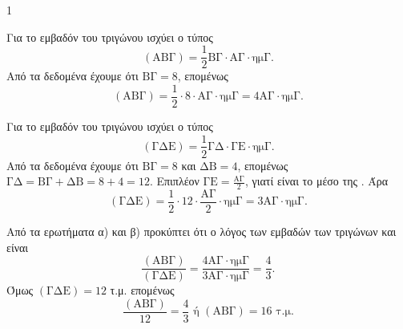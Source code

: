 \begin{ylh}{1}
    \item [Ύλη από εικόνα]
\end{ylh}
\begin{alist}
\item Για το εμβαδόν του τριγώνου  ισχύει ο τύπος
    \[ (\text{ABΓ}) = \frac{1}{2} \text{BΓ} \cdot \text{AΓ} \cdot \text{ημΓ}. \]
    Από τα δεδομένα έχουμε ότι $\text{BΓ} = 8$, επομένως
    \[ (\text{ABΓ}) = \frac{1}{2} \cdot 8 \cdot \text{AΓ} \cdot \text{ημΓ} = 4 \text{AΓ} \cdot \text{ημΓ}. \]
\item Για το εμβαδόν του τριγώνου  ισχύει ο τύπος
    \[ (\text{ΓΔΕ}) = \frac{1}{2} \text{ΓΔ} \cdot \text{ΓΕ} \cdot \text{ημΓ}. \]
    Από τα δεδομένα έχουμε ότι $\text{BΓ} = 8$ και $\text{ΔB} = 4$, επομένως $\text{ΓΔ} = \text{BΓ} + \text{ΔB} = 8 + 4 = 12$.
    Επιπλέον $\text{ΓΕ} = \frac{\text{AΓ}}{2}$, γιατί  είναι το μέσο της . Άρα
    \[ (\text{ΓΔΕ}) = \frac{1}{2} \cdot 12 \cdot \frac{\text{AΓ}}{2} \cdot \text{ημΓ} = 3 \text{AΓ} \cdot \text{ημΓ}. \]
\item Από τα ερωτήματα α) και β) προκύπτει ότι ο λόγος των εμβαδών των τριγώνων  και  είναι
    \[ \frac{(\text{ABΓ})}{(\text{ΓΔΕ})} = \frac{4 \text{AΓ} \cdot \text{ημΓ}}{3 \text{AΓ} \cdot \text{ημΓ}} = \frac{4}{3}. \]
    Όμως $(\text{ΓΔΕ}) = 12$ τ.μ. επομένως
    \[ \frac{(\text{ABΓ})}{12} = \frac{4}{3} \text{ ή } (\text{ABΓ}) = 16 \text{ τ.μ.} \]
\end{alist}